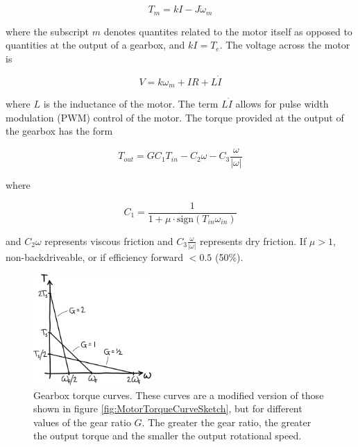 \begin{equation}
T_{m}=kI-J\dot{\omega}_{m}
\label{eq:CompleteMotorLaw1}
\end{equation}

where the subscript $m$ denotes quantites related to the motor itself as opposed to quantities at the output of a gearbox, and $kI=T_{e}$. The voltage across the motor is

\begin{equation}
V=k\omega_{m}+IR+L\dot{I}
\label{eq:CompleteMotorLaw2}
\end{equation}

where $L$ is the inductance of the motor. The term $L\dot{I}$ allows for pulse width modulation (PWM) control of the motor. The torque provided at the output of the gearbox has the form

\begin{equation}
T_{out}=GC_{1}T_{in}-C_{2}\omega-C_{3}\frac{\omega}{|\omega|}
\label{eq:CompleteMotorLaw4}
\end{equation}

where

\begin{equation}
C_{1}=\frac{1}{1+\mu \cdot \mbox{sign}\left(T_{in}\omega_{in}\right)}
\label{eq:CompleteMotorLaw5}
\end{equation}

and $C_{2}\omega$ represents viscous friction and $C_{3}\frac{\omega}{|\omega|}$ represents dry friction. If $\mu > 1$, non-backdriveable, or if efficiency forward $< 0.5$ (50\%).

\begin{figure}[htb]		%
\begin{centering}
\includegraphics[width=0.4\textwidth]{Figures/GearboxCurves}\par
\end{centering}
\caption[Plot: Gearbox Torque Curves]{Gearbox torque curves. These curves are a modified version of those shown in figure \ref{fig:MotorTorqueCurveSketch}, but for different values of the gear ratio $G$. The greater the gear ratio, the greater the output torque and the smaller the output rotational speed.}
\label{fig:GearboxCurves}
\end{figure}
%

